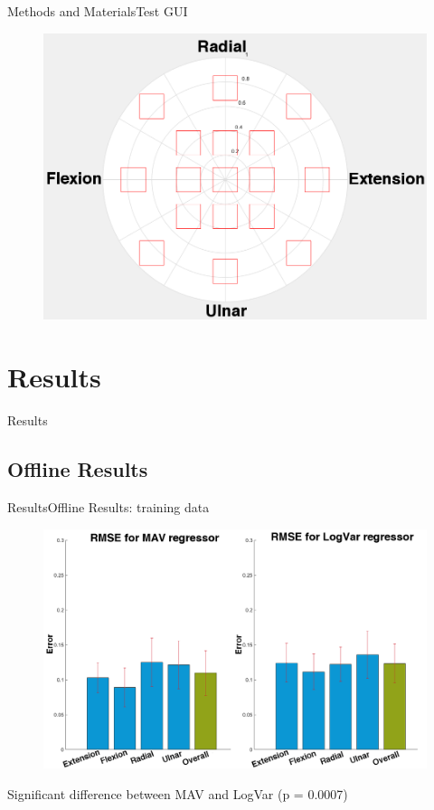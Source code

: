 \documentclass[10pt]{beamer}
\begin{document}
\begin{frame}{Methods and Materials}{Test GUI}
\begin{figure}
	\includegraphics[scale=0.36]{figures/NewPlacesToGo.png}
\end{figure}
\end{frame}


\section{Results}
\begin{frame}{Results}

\end{frame}


\subsection{Offline Results}
	\begin{frame}{Results}{Offline Results: training data}
		\begin{figure}
			\includegraphics[scale=0.27]{figures/gimmeThemRMSEBars.png}
		\end{figure}
	Significant difference between MAV and LogVar (p = 0.0007)
\end{frame}
\end{document}
